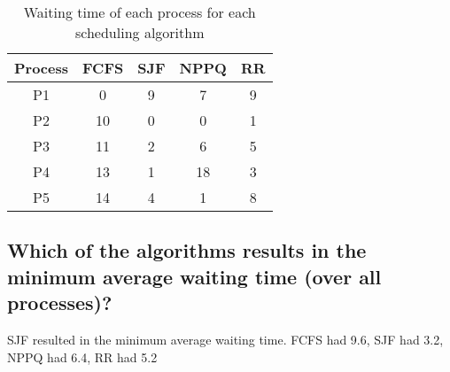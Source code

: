 \documentclass[letterpaper, 10pt,DIV=13]{scrartcl}
\numberwithin{equation}{section} %
\numberwithin{figure}{section} %
\numberwithin{table}{section} %
\begin{document}
\begin{table}[h!]
    \centering
    \begin{tabular}{|c|c|c|c|c|}
        \hline
        \textbf{Process} & \textbf{FCFS} & \textbf{SJF} & \textbf{NPPQ} & \textbf{RR} \\
        \hline
        P1 & 0 & 9 & 7 & 9 \\
        \hline
        P2 & 10 & 0 & 0 & 1 \\
        \hline
        P3 & 11 & 2 & 6 & 5 \\
        \hline
        P4 & 13 & 1 & 18 & 3 \\
        \hline
        P5 & 14 & 4 & 1 & 8 \\
        \hline
    \end{tabular}
    \caption{Waiting time of each process for each scheduling algorithm}
    \label{tab:waiting_time}
\end{table}

\subsection{Which of the algorithms results in the minimum average waiting time (over all processes)?}
SJF resulted in the minimum average waiting time. FCFS had 9.6, SJF had 3.2, NPPQ had 6.4, RR had 5.2
\end{document}
